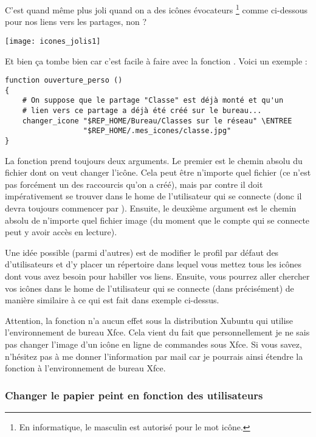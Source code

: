 C'est quand même plus joli quand on a des icônes évocateurs%
%
\footnote{En informatique, le masculin est autorisé pour le mot icône.}
%
comme ci-dessous pour nos liens vers les partages, non ?
%
\begin{center}
\texttt{[image: icones\_jolis1]}
\label{captureic}
\end{center}
%
Et bien ça tombe bien car 
c'est facile à faire avec la fonction .
Voici un exemple :
%
\begin{lstlisting}[emph={ENTREE},emphstyle={\return}]
function ouverture_perso ()
{
    # On suppose que le partage "Classe" est déjà monté et qu'un
    # lien vers ce partage a déjà été créé sur le bureau...
    changer_icone "$REP_HOME/Bureau/Classes sur le réseau" \ENTREE
                  "$REP_HOME/.mes_icones/classe.jpg"
}
\end{lstlisting}
%
La fonction prend toujours deux arguments. Le premier est le chemin absolu
du fichier dont on veut changer l'icône. Cela peut être n'importe
quel fichier (ce n'est pas forcément un des raccourcis qu'on a créé),
mais par contre il doit impérativement se trouver dans le home
de l'utilisateur qui se connecte (donc il devra toujours commencer
par ). Ensuite, le deuxième argument
est le chemin absolu de n'importe quel fichier image (du moment
que le compte qui se connecte peut y avoir accès en lecture).

Une idée possible (parmi d'autres) est de modifier le profil par
défaut des d'utilisateurs et d'y placer un répertoire 
 dans lequel vous mettez tous les icônes
dont vous avez besoin pour habiller vos liens. Ensuite, vous
pourrez aller chercher vos icônes dans le home de l'utilisateur
qui se connecte (dans  précisément)
de manière similaire à ce qui est fait dans exemple
ci-dessus.

\begin{alerte}
Attention, la fonction  n'a aucun effet
sous la distribution Xubuntu qui utilise l'environnement de bureau
Xfce. Cela vient du fait que personnellement je ne sais pas
changer l'image d'un icône en ligne de commandes sous Xfce. Si vous
savez, n'hésitez pas à me donner l'information par mail
car je pourrais ainsi étendre la fonction 
à l'environnement de bureau Xfce.
\end{alerte}




\subsubsection{Changer le papier peint en fonction des utilisateurs}
\label{papier-peint}

